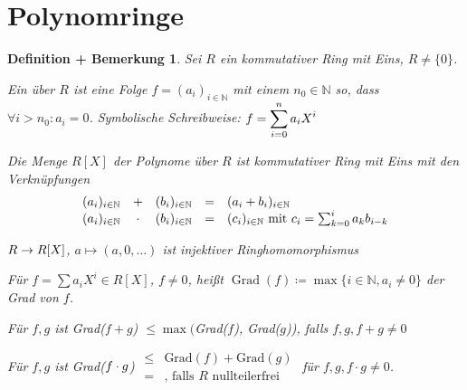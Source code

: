 \documentclass[a4paper,10pt,german]{scrbook}
\newcommand{\da}{\coloneqq}
\theoremstyle{saetze}
\theoremstyle{definitionen}
\newtheorem{DefBem}[Def]{Definition + Bemerkung}
\begin{document}
\section{Polynomringe}

\begin{DefBem}
Sei $R$ ein kommutativer Ring
mit Eins, $R \neq \{0\}$.
\begin{enum}
\item Ein  über $R$ ist eine  Folge $f=(a_i)_{i\in \mathbb N}$ mit einem $n_0\in \mathbb N$ so, dass $\forall i>n_0: a_i=0$.
\newline Symbolische Schreibweise: $\displaystyle f=\sum_{i=0}^n a_i X^i$
\item Die Menge $R[X]$ der Polynome über $R$ ist kommutativer Ring mit Eins mit den Verknüpfungen
\[\begin{array}{lclcl}
(a_i)_{i\in \mathbb N}& + &(b_i)_{i\in \mathbb N}& = &(a_i+ b_i)_{i\in \mathbb N} \\
(a_i)_{i\in\mathbb N} & \cdot &(b_i)_{i\in\mathbb N}& = &(c_i)_{i\in \mathbb N} \text{ mit } c_i  = \sum_{k=0}^i a_k b_{i-k}\end{array}\]
\item $R \rightarrow R[X]$, $a \mapsto (a,0,\dots)$ ist injektiver
Ringhomomorphismus
\item Für $f=\sum a_iX^i\in R[X]$, $f\ne 0$, heißt $\operatorname{Grad}(f)\da \max\{i\in \mathbb N, a_i\ne 0\}$ der Grad von $f$.
\item Für $f,g$ ist Grad($f+g$) $\leq \max($Grad($f$), Grad($g$)), falls $f,g,f+g\ne 0$
\item Für $f,g$ ist Grad($f\cdot g$) $\begin{array}{cc} \leq & \mbox{Grad}(f) +
\mbox{Grad}(g) \\
= & \mbox{, falls } R \mbox{ nullteilerfrei} \end{array}$ für $f,g,f\cdot g\ne 0$.
\end{enum}
\end{DefBem}
\end{document}
